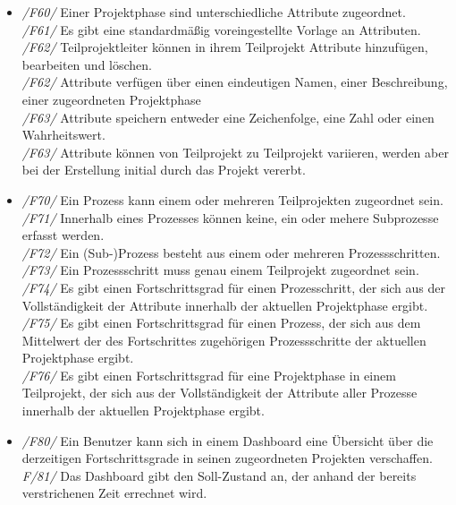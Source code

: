 \begin{itemize}
    \item[] \emph{/F60/} Einer Projektphase sind unterschiedliche Attribute zugeordnet.
    \\\emph{/F61/} Es gibt eine standardmäßig voreingestellte Vorlage an Attributen.
    \\\emph{/F62/} Teilprojektleiter können in ihrem Teilprojekt Attribute hinzufügen, bearbeiten und löschen.
    \\\emph{/F62/} Attribute verfügen über einen eindeutigen Namen, einer Beschreibung, einer zugeordneten Projektphase
    \\\emph{/F63/} Attribute speichern entweder eine Zeichenfolge, eine Zahl oder einen Wahrheitswert.
    \\\emph{/F63/} Attribute können von Teilprojekt zu Teilprojekt variieren, werden aber bei der Erstellung initial durch das Projekt vererbt.
    
    \vspace{0.5cm} 

    \item[] \emph{/F70/} Ein Prozess kann einem oder mehreren Teilprojekten zugeordnet sein.
    \\\emph{/F71/} Innerhalb eines Prozesses können keine, ein oder mehere Subprozesse erfasst werden.
    \\\emph{/F72/} Ein (Sub-)Prozess besteht aus einem oder mehreren Prozessschritten.
    \\\emph{/F73/} Ein Prozessschritt muss genau einem Teilprojekt zugeordnet sein.
    \\\emph{/F74/} Es gibt einen Fortschrittsgrad für einen Prozesschritt, der sich aus der Vollständigkeit der Attribute innerhalb der aktuellen Projektphase ergibt. 
    \\\emph{/F75/} Es gibt einen Fortschrittsgrad für einen Prozess, der sich aus dem Mittelwert der des Fortschrittes zugehörigen Prozessschritte der aktuellen Projektphase ergibt.
    \\\emph{/F76/} Es gibt einen Fortschrittsgrad für eine Projektphase in einem Teilprojekt, der sich aus der Vollständigkeit der Attribute aller Prozesse innerhalb der aktuellen Projektphase ergibt.
    \vspace{0.5cm} 
    
    \item[] \emph{/F80/} Ein Benutzer kann sich in einem Dashboard eine Übersicht über die derzeitigen Fortschrittsgrade in seinen zugeordneten Projekten verschaffen.
    \\\emph{F/81/} Das Dashboard gibt den Soll-Zustand an, der anhand der bereits verstrichenen Zeit errechnet wird.
\end{itemize}



